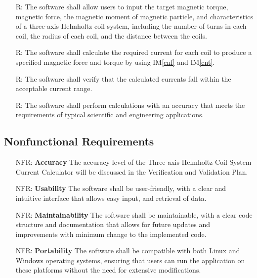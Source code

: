 \documentclass[12pt]{article}
\newcommand{\iref}[1]{IM\ref{#1}}
\newcounter{reqnum} %
\newcounter{nfrnum} %
\begin{document}
\noindent \begin{itemize}

\item[R\refstepcounter{reqnum}\thereqnum \label{R_Inputs}:] {The software shall allow users to input the target magnetic torque, magnetic force, the magnetic moment of magnetic particle, and characteristics of a three-axis Helmholtz coil system, including the number of turns in each coil, the radius of each coil, and the distance between the coils.}

\item[R\refstepcounter{reqnum}\thereqnum \label{R_Calculate}:] {The software shall calculate the required current for each coil to produce a specified magnetic force and torque by using \iref{cnf} and \iref{cnt}.}

\item[R\refstepcounter{reqnum}\thereqnum \label{R_Verify}:] {The software shall verify that the calculated currents fall within the acceptable current range.}

\item[R\refstepcounter{reqnum}\thereqnum \label{R_Acu}:] {The software shall perform calculations with an accuracy that meets the requirements of typical scientific and engineering applications.}

\end{itemize}

\subsection{Nonfunctional Requirements}

\noindent \begin{itemize}

\item[NFR\refstepcounter{nfrnum}\thenfrnum \label{NFR_Accuracy}:]
  \textbf{Accuracy}{ The accuracy level of the Three-axis Helmholtz Coil System Current Calculator will be discussed in the Verification and Validation Plan.}

\item[NFR\refstepcounter{nfrnum}\thenfrnum \label{NFR_Usability}:]
 \textbf{Usability}{ The software shall be user-friendly, with a clear and intuitive interface that allows easy input, and retrieval of data.}

\item[NFR\refstepcounter{nfrnum}\thenfrnum \label{NFR_Maintainability}:]
  \textbf{Maintainability}{ The software shall be maintainable, with a clear code structure and documentation that allows for future updates and improvements with minimum change to the implemented code.}

\item[NFR\refstepcounter{nfrnum}\thenfrnum \label{NFR_Portability}:]
  \textbf{Portability}{ The software shall be compatible with both Linux and Windows operating systems, ensuring that users can run the application on these platforms without the need for extensive modifications. }


\end{itemize}
\end{document}
